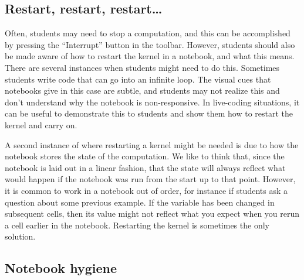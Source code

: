\documentclass[]{book}
\begin{document}
\subsection{Restart, restart,
restart\ldots{}}\label{restart-restart-restart}

Often, students may need to stop a computation, and this can be
accomplished by pressing the ``Interrupt'' button in the toolbar.
However, students should also be made aware of how to restart the kernel
in a notebook, and what this means. There are several instances when
students might need to do this. Sometimes students write code that can
go into an infinite loop. The visual cues that notebooks give in this
case are subtle, and students may not realize this and don't understand
why the notebook is non-responsive. In live-coding situations, it can be
useful to demonstrate this to students and show them how to restart the
kernel and carry on.

A second instance of where restarting a kernel might be needed is due to
how the notebook stores the state of the computation. We like to think
that, since the notebook is laid out in a linear fashion, that the state
will always reflect what would happen if the notebook was run from the
start up to that point. However, it is common to work in a notebook out
of order, for instance if students ask a question about some previous
example. If the variable has been changed in subsequent cells, then its
value might not reflect what you expect when you rerun a cell earlier in
the notebook. Restarting the kernel is sometimes the only solution.

\subsection{Notebook hygiene}\label{notebook-hygiene}
\end{document}
